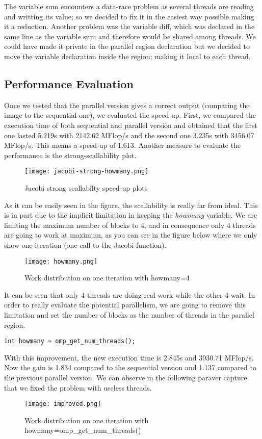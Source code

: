\justify
The variable sum encounters a data-race problem as several threads are reading and writting its value; so we decided to fix it in the easiest way possible making it a reduction. Another problem was the variable diff, which was declared in the same line as the variable sum and therefore would be shared among threads. We could have made it private in the parallel region declaration but we decided to move the variable declaration inside the region; making it local to each thread.
\justify
\subsection{Performance Evaluation}
\justify
Once we tested that the parallel version gives a correct output (comparing the image to the sequential one), we evaluated the speed-up. First, we compared the execution time of both sequential and parallel version and obtained that the first one lasted 5.219s with 2142.62 MFlop/s and the second one 3.235s with 3456.07 MFlop/s. This means a speed-up of 1.613.
\clearpage
\justify
Another measure to evaluate the performance is the strong-scallability plot.
\begin{figure}[h!]
    \centering
    \texttt{[image: jacobi-strong-howmany.png]}
    \caption{Jacobi strong scallabilty speed-up plots}
    \label{fig:stronghowmany}
\end{figure}
\justify
As it can be easily seen in the figure, the scallability is really far from ideal. This is in part due to the implicit limitation in keeping the \textit{howmany} variable. We are limiting the maximum number of blocks to 4, and in consequence only 4 threads are going to work at maximum, as you can see in the figure below where we only show one iteration (one call to the Jacobi function).
\begin{figure}[h!]
    \centering
    \texttt{[image: howmany.png]}
    \caption{Work distribution on one iteration with howmany=4}
    \label{fig:howmany}
\end{figure}
\justify
It can be seen that only 4 threads are doing real work while the other 4 wait.
\justify
In order to really evaluate the potential parallelism, we are going to remove this limitation and set the number of blocks as the number of threads in the parallel region.
\begin{lstlisting}
int howmany = omp_get_num_threads();
\end{lstlisting}
\justify
With this improvement, the new execution time is 2.845s and 3930.71 MFlop/s. Now the gain is 1.834 compared to the sequential version and 1.137 compared to the previous parallel version. We can observe in the following paraver capture that we fixed the problem with useless threads.
\begin{figure}[h!]
    \centering
    \texttt{[image: improved.png]}
    \caption{Work distribution on one iteration with howmany=omp\_get\_num\_threads()}
    \label{fig:howmanyyy}
\end{figure}

